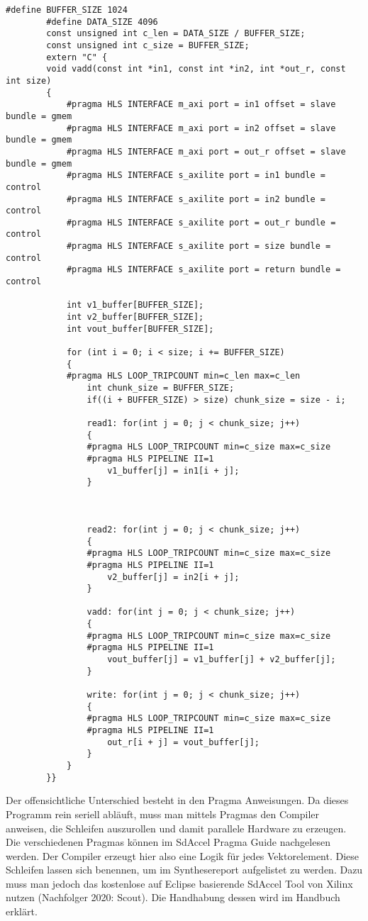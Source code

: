 		\begin{lstlisting}[caption=~FPGA: C Kernel]	
		#define BUFFER_SIZE 1024
		#define DATA_SIZE 4096
		const unsigned int c_len = DATA_SIZE / BUFFER_SIZE;
		const unsigned int c_size = BUFFER_SIZE;
		extern "C" {
		void vadd(const int *in1, const int *in2, int *out_r, const int size)
		{
			#pragma HLS INTERFACE m_axi port = in1 offset = slave bundle = gmem
			#pragma HLS INTERFACE m_axi port = in2 offset = slave bundle = gmem
			#pragma HLS INTERFACE m_axi port = out_r offset = slave bundle = gmem
			#pragma HLS INTERFACE s_axilite port = in1 bundle = control
			#pragma HLS INTERFACE s_axilite port = in2 bundle = control
			#pragma HLS INTERFACE s_axilite port = out_r bundle = control
			#pragma HLS INTERFACE s_axilite port = size bundle = control
			#pragma HLS INTERFACE s_axilite port = return bundle = control

			int v1_buffer[BUFFER_SIZE];
			int v2_buffer[BUFFER_SIZE];
			int vout_buffer[BUFFER_SIZE];

			for (int i = 0; i < size; i += BUFFER_SIZE) 
			{
			#pragma HLS LOOP_TRIPCOUNT min=c_len max=c_len
				int chunk_size = BUFFER_SIZE;
				if((i + BUFFER_SIZE) > size) chunk_size = size - i;
				
				read1: for(int j = 0; j < chunk_size; j++) 
				{
				#pragma HLS LOOP_TRIPCOUNT min=c_size max=c_size
				#pragma HLS PIPELINE II=1
					v1_buffer[j] = in1[i + j];
				}



				read2: for(int j = 0; j < chunk_size; j++) 
				{
				#pragma HLS LOOP_TRIPCOUNT min=c_size max=c_size
				#pragma HLS PIPELINE II=1
					v2_buffer[j] = in2[i + j];
				}

				vadd: for(int j = 0; j < chunk_size; j++) 
				{
				#pragma HLS LOOP_TRIPCOUNT min=c_size max=c_size
				#pragma HLS PIPELINE II=1
					vout_buffer[j] = v1_buffer[j] + v2_buffer[j];
				}

				write: for(int j = 0; j < chunk_size; j++) 
				{
				#pragma HLS LOOP_TRIPCOUNT min=c_size max=c_size
				#pragma HLS PIPELINE II=1
					out_r[i + j] = vout_buffer[j];
				}
			}
		}}
		\end{lstlisting}		
		
		Der offensichtliche Unterschied besteht in den Pragma Anweisungen. Da dieses Programm rein seriell abläuft, muss man mittels Pragmas den Compiler anweisen, die Schleifen auszurollen und damit parallele Hardware zu erzeugen. Die verschiedenen Pragmas können im SdAccel Pragma Guide \autocite{pragma} nachgelesen werden. Der Compiler erzeugt hier also eine Logik für jedes Vektorelement. Diese Schleifen lassen sich benennen, um im Synthesereport aufgelistet zu werden. Dazu muss man jedoch das kostenlose auf Eclipse basierende SdAccel Tool von Xilinx nutzen (Nachfolger 2020: Scout). Die Handhabung dessen wird im Handbuch erklärt. \autocite{sdaccel}
		
